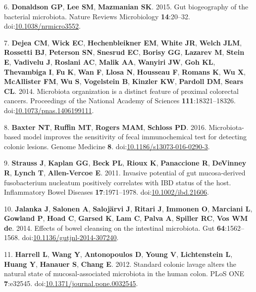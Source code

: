 \documentclass[11pt,]{article}
\begin{document}
\hypertarget{ref-Donaldson2015}{}
6. \textbf{Donaldson GP}, \textbf{Lee SM}, \textbf{Mazmanian SK}. 2015.
Gut biogeography of the bacterial microbiota. Nature Reviews
Microbiology \textbf{14}:20--32.
doi:\href{https://doi.org/10.1038/nrmicro3552}{10.1038/nrmicro3552}.

\hypertarget{ref-Dejea2014}{}
7. \textbf{Dejea CM}, \textbf{Wick EC}, \textbf{Hechenbleikner EM},
\textbf{White JR}, \textbf{Welch JLM}, \textbf{Rossetti BJ},
\textbf{Peterson SN}, \textbf{Snesrud EC}, \textbf{Borisy GG},
\textbf{Lazarev M}, \textbf{Stein E}, \textbf{Vadivelu J},
\textbf{Roslani AC}, \textbf{Malik AA}, \textbf{Wanyiri JW}, \textbf{Goh
KL}, \textbf{Thevambiga I}, \textbf{Fu K}, \textbf{Wan F}, \textbf{Llosa
N}, \textbf{Housseau F}, \textbf{Romans K}, \textbf{Wu X},
\textbf{McAllister FM}, \textbf{Wu S}, \textbf{Vogelstein B},
\textbf{Kinzler KW}, \textbf{Pardoll DM}, \textbf{Sears CL}. 2014.
Microbiota organization is a distinct feature of proximal colorectal
cancers. Proceedings of the National Academy of Sciences
\textbf{111}:18321--18326.
doi:\href{https://doi.org/10.1073/pnas.1406199111}{10.1073/pnas.1406199111}.

\hypertarget{ref-Baxter2016}{}
8. \textbf{Baxter NT}, \textbf{Ruffin MT}, \textbf{Rogers MAM},
\textbf{Schloss PD}. 2016. Microbiota-based model improves the
sensitivity of fecal immunochemical test for detecting colonic lesions.
Genome Medicine \textbf{8}.
doi:\href{https://doi.org/10.1186/s13073-016-0290-3}{10.1186/s13073-016-0290-3}.

\hypertarget{ref-Strauss2011}{}
9. \textbf{Strauss J}, \textbf{Kaplan GG}, \textbf{Beck PL},
\textbf{Rioux K}, \textbf{Panaccione R}, \textbf{DeVinney R},
\textbf{Lynch T}, \textbf{Allen-Vercoe E}. 2011. Invasive potential of
gut mucosa-derived fusobacterium nucleatum positively correlates with
IBD status of the host. Inflammatory Bowel Diseases
\textbf{17}:1971--1978.
doi:\href{https://doi.org/10.1002/ibd.21606}{10.1002/ibd.21606}.

\hypertarget{ref-Jalanka2014}{}
10. \textbf{Jalanka J}, \textbf{Salonen A}, \textbf{Salojärvi J},
\textbf{Ritari J}, \textbf{Immonen O}, \textbf{Marciani L},
\textbf{Gowland P}, \textbf{Hoad C}, \textbf{Garsed K}, \textbf{Lam C},
\textbf{Palva A}, \textbf{Spiller RC}, \textbf{Vos WM de}. 2014. Effects
of bowel cleansing on the intestinal microbiota. Gut
\textbf{64}:1562--1568.
doi:\href{https://doi.org/10.1136/gutjnl-2014-307240}{10.1136/gutjnl-2014-307240}.

\hypertarget{ref-Harrell2012}{}
11. \textbf{Harrell L}, \textbf{Wang Y}, \textbf{Antonopoulos D},
\textbf{Young V}, \textbf{Lichtenstein L}, \textbf{Huang Y},
\textbf{Hanauer S}, \textbf{Chang E}. 2012. Standard colonic lavage
alters the natural state of mucosal-associated microbiota in the human
colon. PLoS ONE \textbf{7}:e32545.
doi:\href{https://doi.org/10.1371/journal.pone.0032545}{10.1371/journal.pone.0032545}.
\end{document}
